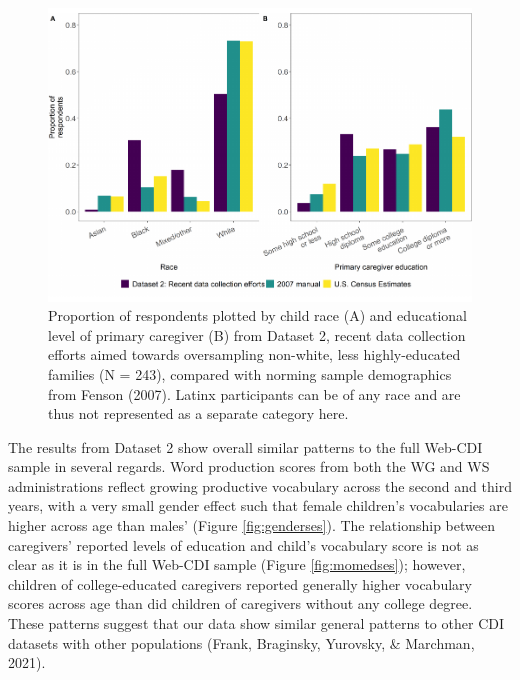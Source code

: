 \documentclass[
  english,
  ,man,floatsintext]{apa6}
\begin{document}
\begin{figure}
\centering
\includegraphics{webcdi_paper_files/figure-latex/demobarses-1.pdf}
\caption{\label{fig:demobarses}Proportion of respondents plotted by child race (A) and educational level of primary caregiver (B) from Dataset 2, recent data collection efforts aimed towards oversampling non-white, less highly-educated families (N = 243), compared with norming sample demographics from Fenson (2007). Latinx participants can be of any race and are thus not represented as a separate category here.}
\end{figure}

The results from Dataset 2 show overall similar patterns to the full Web-CDI sample in several regards. Word production scores from both the WG and WS administrations reflect growing productive vocabulary across the second and third years, with a very small gender effect such that female children's vocabularies are higher across age than males' (Figure \ref{fig:genderses}). The relationship between caregivers' reported levels of education and child's vocabulary score is not as clear as it is in the full Web-CDI sample (Figure \ref{fig:momedses}); however, children of college-educated caregivers reported generally higher vocabulary scores across age than did children of caregivers without any college degree. These patterns suggest that our data show similar general patterns to other CDI datasets with other populations (Frank, Braginsky, Yurovsky, \& Marchman, 2021).
\end{document}
